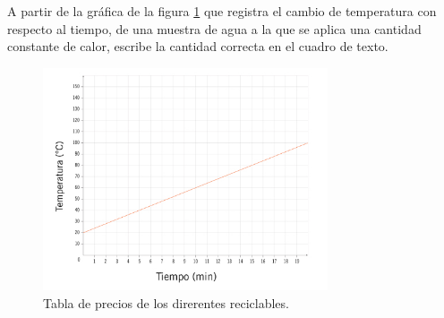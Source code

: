 A partir de la gráfica de la figura \ref{fig:SINMAT1_U3_AC75_IMG3} que registra el cambio de temperatura con respecto al tiempo, de una muestra de agua a la que se aplica una cantidad constante de calor, escribe la cantidad correcta en el cuadro de texto.
\begin{figure}[H]
    \centering
    \includegraphics[width=0.75\textwidth]{../images/SINMAT1_U3_AC75_IMG3.jpg}
    \caption{Tabla de precios de los direrentes reciclables.}
    \label{fig:SINMAT1_U3_AC75_IMG3}
\end{figure}
\begin{parts}
    
    
    
    
    

\end{parts}